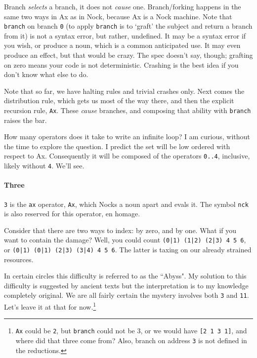 \documentclass[twoside]{article}
\begin{document}
Branch \emph{selects} a branch, it does not \emph{cause} one. Branch/forking happens in the same two ways in Ax as in Nock, because Ax is a Nock machine. Note that \texttt{branch} on branch \texttt{0} (to apply \texttt{branch} is to `graft' the subject and return a branch from it) is not a syntax error, but rather, undefined. It may be a syntax error if you wish, or produce a noun, which is a common anticipated use. It may even produce an effect, but that would be crazy. The spec doesn't say, though; grafting on zero means your code is not deterministic. Crashing is the best idea if you don't know what else to do. 

Note that so far, we have halting rules and trivial crashes only. Next comes the distribution rule, which gets us most of the way there, and then the explicit recursion rule, \texttt{Ax}. These \emph{cause} branches, and composing that ability with \texttt{branch} raises the bar. 

How many operators does it take to write an infinite loop? I am curious, without the time to explore the question. I predict the set will be low ordered with respect to Ax. Consequently it will be composed of the operators \texttt{0..4}, inclusive, likely without \texttt{4}. We'll see. 

\paragraph{Three}

\texttt{3} is the \texttt{ax} operator, \texttt{Ax}, which Nocks a noun apart and evals it. The symbol \texttt{nck} is also reserved for this operator, en homage. %

Consider that there are two ways to index: by zero, and by one. What if you want to contain the damage? Well, you could count \texttt{(0|1) (1|2) (2|3) 4 5 6}, or \texttt{(0|1) (0|1) (2|3) (3|4) 4 5 6}. The latter is taxing on our already strained resources. 

In certain circles this difficulty is referred to as the ``Abyss". My solution to this difficulty is suggested by ancient texts but the interpretation is to my knowledge completely original. We are all fairly certain the mystery involves both \texttt{3} and \texttt{11}. Let's leave it at that for now.\footnote{\texttt{Ax} could be \texttt{2}, but \texttt{branch} could not be 3, or we would have \texttt{[2 1 3 1]}, and where did that three come from? Also, branch on address \texttt{3} is not defined in the reductions.}
\end{document}

